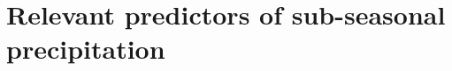 \chapter{Relevant predictors of sub-seasonal precipitation}


\ifpdf
    \graphicspath{{content/chapter5/figs/raster/}{content/chapter5/figs/pdf/}{content/chapter5/figs/}}
\else
    \graphicspath{{content/chapter5/figs/vector/}{content/chapter5/figs/}}
\fi



